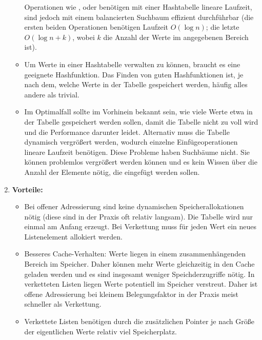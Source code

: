 \documentclass[11pt,a4paper]{article}
\begin{document}
\begin{loesung}
\begin{enumerate}
\begin{itemize}
            Operationen wie ,  oder  benötigen mit einer Hashtabelle lineare Laufzeit, sind jedoch mit einem balancierten Suchbaum effizient durchführbar (die ersten beiden Operationen benötigen Laufzeit $O(\log n)$; die letzte $O(\log n + k)$, wobei $k$ die Anzahl der Werte im angegebenen Bereich ist).
            \item Um Werte in einer Hashtabelle verwalten zu können, braucht es eine geeignete Hashfunktion.
            Das Finden von guten Hashfunktionen ist, je nach dem, welche Werte in der Tabelle gespeichert werden, häufig alles andere als trivial.
            \item Im Optimalfall sollte im Vorhinein bekannt sein, wie viele Werte etwa in der Tabelle gespeichert werden sollen, damit die Tabelle nicht zu voll wird und die Performance darunter leidet.
            Alternativ muss die Tabelle dynamisch vergrößert werden, wodurch einzelne Einfügeoperationen lineare Laufzeit benötigen.
            Diese Probleme haben Suchbäume nicht.
            Sie können problemlos vergrößert werden können und es kein Wissen über die Anzahl der Elemente nötig, die eingefügt werden sollen.
        \end{itemize}
        \item
        \textbf{Vorteile:}
        \begin{itemize}
            \item Bei offener Adressierung sind keine dynamischen Speicherallokationen nötig (diese sind in der Praxis oft relativ langsam).
            Die Tabelle wird nur einmal am Anfang erzeugt.
            Bei Verkettung muss für jeden Wert ein neues Listenelement allokiert werden.
            \item Besseres Cache-Verhalten: Werte liegen in einem zusammenhängenden Bereich im Speicher.
            Daher können mehr Werte gleichzeitig in den Cache geladen werden und es sind insgesamt weniger Speichderzugriffe nötig.
            In verketteten Listen liegen Werte potentiell im Speicher verstreut.
            Daher ist offene Adressierung bei kleinem Belegungsfaktor in der Praxis meist schneller als Verkettung.
            \item Verkettete Listen benötigen durch die zusätzlichen Pointer je nach Größe der eigentlichen Werte relativ viel Speicherplatz.

\end{itemize}
\end{enumerate}
\end{loesung}
\end{document}
